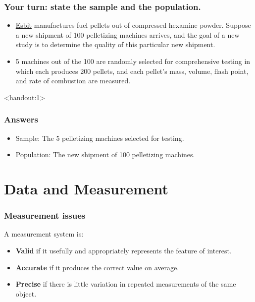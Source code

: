\documentclass[handout]{beamer}\usepackage{graphicx, color}
\newcommand{\answers}{1}
\numberwithin{equation}{section}
\begin{document}
\begin{frame}
\frametitle{Your turn: state the sample and the population.} \small
\begin{itemize}
\item \href{http://www.esbit.net/}{Esbit} manufactures fuel pellets out of compressed hexamine powder. Suppose a new shipment of 100 pelletizing machines arrives, and the goal of a new study is to determine the quality of this particular new shipment. 
\pause \item 5 machines out of the 100 are randomly selected for comprehensive testing in which each produces 200 pellets, and each pellet's mass, volume, flash point, and rate of combustion are measured.
\end{itemize}
\end{frame}

\begin{frame}<handout:\answers>
\frametitle{Answers}
\begin{itemize}
\item Sample: The 5 pelletizing machines selected for testing.
\pause \item Population: The new shipment of 100 pelletizing machines.
\end{itemize}
\end{frame}







\section{Data and Measurement}

\begin{frame}
\frametitle{Measurement issues}

A measurement system is:
\begin{itemize}
\item {\bf Valid} if it usefully and appropriately represents the feature  of interest.
\pause \item {\bf Accurate} if it produces the correct value on average. 
\pause \item {\bf Precise} if there is little variation in repeated measurements of the same object. 
\end{itemize}
\end{frame}
\end{document}

